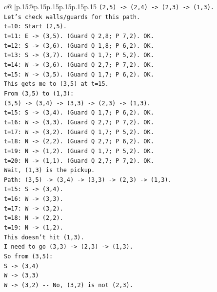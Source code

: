 \documentclass{article}
\begin{document}
{\begin{supertabular}{c@{$\;$}|p{.15\linewidth}@{}p{.15\linewidth}p{.15\linewidth}p{.15\linewidth}p{.15\linewidth}p{.15\linewidth}}
{{{\texttt{(2,5) {-}> (2,4) {-}> (2,3) {-}> (1,3).} \\
\texttt{Let's check walls/guards for this path.} \\
\texttt{t=10: Start (2,5).} \\
\texttt{t=11: E {-}> (3,5). (Guard Q 2,8; P 7,2). OK.} \\
\texttt{t=12: S {-}> (3,6). (Guard Q 1,8; P 6,2). OK.} \\
\texttt{t=13: S {-}> (3,7). (Guard Q 1,7; P 5,2). OK.} \\
\texttt{t=14: W {-}> (3,6). (Guard Q 2,7; P 7,2). OK.} \\
\texttt{t=15: W {-}> (3,5). (Guard Q 1,7; P 6,2). OK.} \\
\texttt{This gets me to (3,5) at t=15.} \\
\texttt{From (3,5) to (1,3):} \\
\texttt{(3,5) {-}> (3,4) {-}> (3,3) {-}> (2,3) {-}> (1,3).} \\
\texttt{t=15: S {-}> (3,4). (Guard Q 1,7; P 6,2). OK.} \\
\texttt{t=16: W {-}> (3,3). (Guard Q 2,7; P 7,2). OK.} \\
\texttt{t=17: W {-}> (3,2). (Guard Q 1,7; P 5,2). OK.} \\
\texttt{t=18: N {-}> (2,2). (Guard Q 2,7; P 6,2). OK.} \\
\texttt{t=19: N {-}> (1,2). (Guard Q 1,7; P 5,2). OK.} \\
\texttt{t=20: N {-}> (1,1). (Guard Q 2,7; P 7,2). OK.} \\
\texttt{Wait, (1,3) is the pickup.} \\
\texttt{Path: (3,5) {-}> (3,4) {-}> (3,3) {-}> (2,3) {-}> (1,3).} \\
\texttt{t=15: S {-}> (3,4).} \\
\texttt{t=16: W {-}> (3,3).} \\
\texttt{t=17: W {-}> (3,2).} \\
\texttt{t=18: N {-}> (2,2).} \\
\texttt{t=19: N {-}> (1,2).} \\
\texttt{This doesn't hit (1,3).} \\
\texttt{I need to go (3,3) {-}> (2,3) {-}> (1,3).} \\
\texttt{So from (3,5):} \\
\texttt{S {-}> (3,4)} \\
\texttt{W {-}> (3,3)} \\
\texttt{W {-}> (3,2) {-}{-} No, (3,2) is not (2,3).} \\
}}}
\end{supertabular}}
\end{document}

